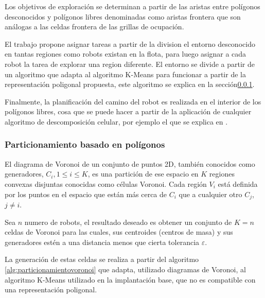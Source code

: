 Los objetivos de exploración se determinan a partir de las aristas entre polígonos desconocidos y polígonos libres denominadas como aristas frontera que son análogas a las celdas frontera de las grillas de ocupación.

El trabajo propone asignar tareas a partir de la division el entorno desconocido en tantas regiones como robots existan en la flota, para luego asignar a cada robot la tarea de explorar una region diferente. El entorno se divide a partir de un algoritmo que adapta al algoritmo K-Means para funcionar a partir de la representación poligonal propuesta, este algoritmo se explica en la sección\ref{subsubsec:particionamientovoronoi}.  


Finalmente, la planificación del camino del robot es realizada en el interior de los polígonos libres, cosa que se puede hacer a partir de la aplicación de cualquier algoritmo de descomposición celular, por ejemplo el que se explica en \cite{schachter1978decomposition}.
   
\subsubsection{Particionamiento basado en polígonos}\label{subsubsec:particionamientovoronoi}
El diagrama de Voronoi\cite{fortune1987sweepline} de un conjunto de puntos 2D, también conocidos como generadores, $C_{i} , 1 \leq i \leq K$, es una partición de ese espacio en $K$ regiones convexas disjuntas conocidas como células Voronoi. Cada región $V_i$ está definida por los puntos en el espacio que están más cerca de $C_{i}$ que a cualquier otro $C_{j}$, $j\neq i$. 

Sea $n$ numero de robots, el resultado deseado es obtener un conjunto de $K=n$ celdas de Voronoi para las cuales, sus centroides (centros de masa) y sus generadores estén a una distancia menos que cierta tolerancia $\varepsilon$. %

La generación de estas celdas se realiza a partir del algoritmo \ref{alg:particionamientovoronoi} que adapta, utilizado diagramas de Voronoi, al algoritmo K-Means utilizado en la implantación base, que no es compatible con una representación poligonal.

